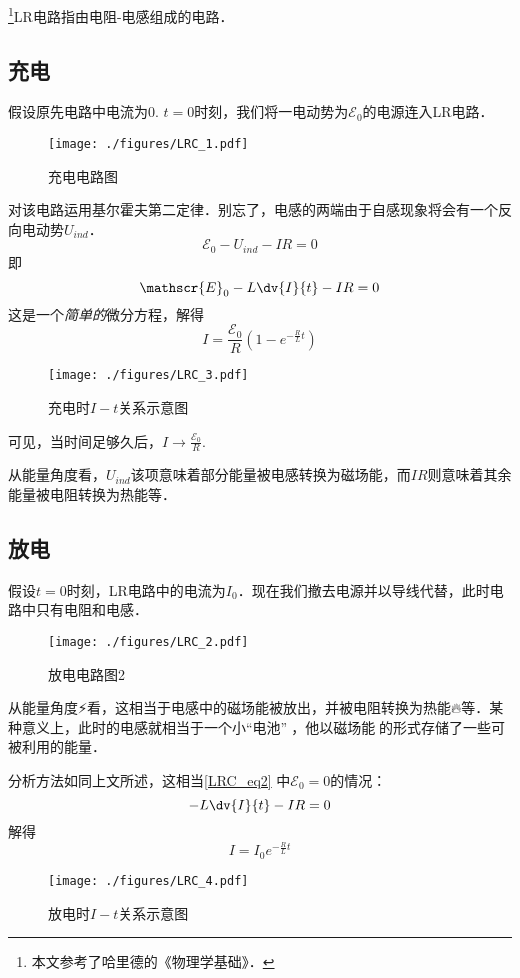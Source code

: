 

\footnote{本文参考了哈里德的《物理学基础》．}LR电路指由电阻-电感组成的电路．

\subsection{充电}
假设原先电路中电流为$0$. $t=0$时刻，我们将一电动势为$\mathscr{E}_0$的电源连入LR电路．
\begin{figure}[ht]
\centering
\texttt{[image: ./figures/LRC\_1.pdf]}
\caption{充电电路图} \label{LRC_fig1}
\end{figure}

对该电路运用基尔霍夫第二定律．别忘了，电感的两端由于自感现象将会有一个反向电动势$U_{ind}$．
$$
\mathscr{E}_0 - U_{ind} - IR = 0
$$
即
\begin{equation}\label{LRC_eq2}
\mathscr{E}_0 - L\dv{I}{t} - IR = 0
\end{equation}
这是一个\textsl{简单的}微分方程，解得
\begin{equation}\label{LRC_eq1}
I = \frac{\mathscr{E}_0}{R} (1-e^{-\frac{R}{L}t})
\end{equation}

\begin{figure}[ht]
\centering
\texttt{[image: ./figures/LRC\_3.pdf]}
\caption{充电时$I-t$关系示意图} \label{LRC_fig3}
\end{figure}
可见，当时间足够久后，$I\to\frac{\mathscr{E_0}}{R}$.

从能量角度看，$U_{ind}$该项意味着部分能量被电感转换为磁场能，而$IR$则意味着其余能量被电阻转换为热能等．

\subsection{放电}
假设$t=0$时刻，LR电路中的电流为$I_0$．现在我们撤去电源并以导线代替，此时电路中只有电阻和电感．
\begin{figure}[ht]
\centering
\texttt{[image: ./figures/LRC\_2.pdf]}
\caption{放电电路图2} \label{LRC_fig2}
\end{figure}
从能量角度⚡️看，这相当于电感中的磁场能被放出，并被电阻转换为热能🔥等．某种意义上，此时的电感就相当于一个小“电池”🔋，他以磁场能🧲的形式存储了一些可被利用的能量．

分析方法如同上文所述，这相当\autoref{LRC_eq2}  中$\mathscr{E}_0=0$的情况：
\begin{equation}
- L\dv{I}{t} - IR = 0
\end{equation}
解得
\begin{equation}
I = I_0 e^{-\frac{R}{L}t}
\end{equation}
\begin{figure}[ht]
\centering
\texttt{[image: ./figures/LRC\_4.pdf]}
\caption{放电时$I-t$关系示意图} \label{LRC_fig4}
\end{figure}
